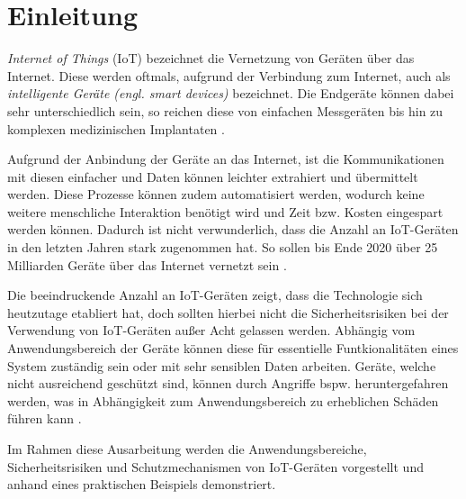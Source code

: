 \section{Einleitung}
\textit{Internet of Things} (IoT) bezeichnet die Vernetzung von Geräten
über das Internet.  Diese werden oftmals, aufgrund der Verbindung zum Internet,
auch als \textit{intelligente Geräte (engl. smart devices)} bezeichnet. Die
Endgeräte können dabei sehr unterschiedlich sein, so reichen diese von
einfachen Messgeräten bis hin zu komplexen medizinischen Implantaten
\cite{paper}.

Aufgrund der Anbindung der Geräte an das Internet, ist die Kommunikationen mit
diesen einfacher und Daten können leichter extrahiert und übermittelt werden.
Diese Prozesse können zudem automatisiert werden, wodurch keine weitere
menschliche Interaktion benötigt wird und Zeit bzw. Kosten eingespart werden
können. Dadurch ist nicht verwunderlich, dass die Anzahl an IoT-Geräten in den
letzten Jahren stark zugenommen hat. So sollen bis Ende 2020 über 25 Milliarden
Geräte über das Internet vernetzt sein \cite{paper}.

Die beeindruckende Anzahl an IoT-Geräten zeigt, dass die Technologie sich
heutzutage etabliert hat, doch sollten hierbei nicht die Sicherheitsrisiken bei
der Verwendung von IoT-Geräten außer Acht gelassen werden. Abhängig vom
Anwendungsbereich der Geräte können diese für essentielle Funtkionalitäten eines
System zuständig sein oder mit sehr sensiblen Daten arbeiten.  Geräte, welche
nicht ausreichend geschützt sind, können durch Angriffe bspw.  heruntergefahren
werden, was in Abhängigkeit zum Anwendungsbereich zu erheblichen Schäden führen
kann \cite{paper}.

Im Rahmen diese Ausarbeitung werden die Anwendungsbereiche, Sicherheitsrisiken
und Schutzmechanismen von IoT-Geräten vorgestellt und anhand eines praktischen
Beispiels demonstriert.
